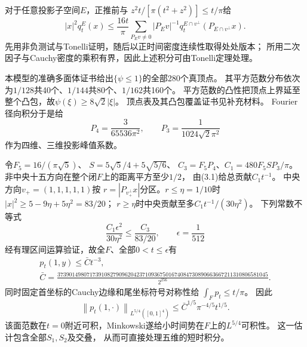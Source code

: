 \documentclass[UTF8,fontset=fandol,zihao=-4,a4paper]{ctexart}
\newcommand{\1}{\mathbf 1}
\newcommand{\norm}[1]{\left\lVert#1\right\rVert}
\begin{document}
对于任意投影子空间$E$，正推前与
$z^2t/[\pi(t^2+z^2)]\le t/\pi$给
\[
 |x|^2q_t^E(x)\le\frac{16t}{\pi}
 \sum_{P_Ev\ne0}|P_Ev|^{-1}q_t^{E\cap v^\perp}(P_{E\cap v^\perp}x).
 \tag{3.1}
\]
先用非负测试与Tonelli证明，随后以正时间密度连续性取得处处版本；
所用二次因子与Cauchy密度的乘积有界，因此上述积分可由Tonelli定理处理。

本模型的准确多面体证书给出$\{\psi\le1\}$的全部280个真顶点。
其平方范数分布依次为$1/128$共40个、$1/144$共80个、$1/162$共160个。
平方范数的凸性把顶点上界延至整个凸包，故$\psi(\xi)\ge8\sqrt2|\xi|$。
顶点表及其凸包覆盖证书见补充材料。
Fourier径向积分于是给
\[
 P_4=\frac3{65536\pi^2},\qquad P_3=\frac1{1024\sqrt2\pi^2}
\]
作为四维、三维投影峰值系数。

令$F_5=16/(\pi\sqrt5)$、
$S=5\sqrt5/4+5\sqrt{5/6}$、
$C_3=F_5P_4$、$C_1=480F_5SP_3/\pi$。
非中央十五方向在整个闭$F$上的距离平方至少$1/2$，
由(3.1)给总贡献$C_1t^{-1}$。
中央方向$v_+=(1,1,1,1,1)$按
$r=|P_{v_+^\perp}x|$分区。$r\le\eta=1/10$时
$|x|^2\ge5-9\eta+5\eta^2=83/20$；
$r\ge\eta$时中央贡献至多$C_1t^{-1}/(30\eta^2)$。
下列常数不等式
\[
 \frac{C_1\epsilon^2}{30\eta^2}\le\frac{C_3}{83/20},
 \qquad \epsilon=\frac1{512}
\]
经有理区间运算验证，故全$F$、全部$0<t\le\epsilon$有
\[
 \begin{gathered}
 p_t(1,y)\le\bar C t^{-3},\\
 \bar C=\frac{373901498071739108279096204237109367501674084730890663667211310806581045}{2^{256}}.
 \end{gathered}
 \tag{3.2}
\]
同时固定首坐标的Cauchy边缘和尾坐标符号对称性给
$\int_Fp_t\le t/\pi$。
因此
\[
 \norm{p_t(1,\cdot)}_{L^{5/4}([0,1]^4)}
 \le\bar C^{1/5}\pi^{-4/5}t^{1/5}.
\]
该面范数在$t=0$附近可积，Minkowski遂给小时间势在$F$上的$L^{5/4}$可积性。
这一估计包含全部$S_1,S_2$及交叠，
从而可直接处理五维的短时积分。
\end{document}
